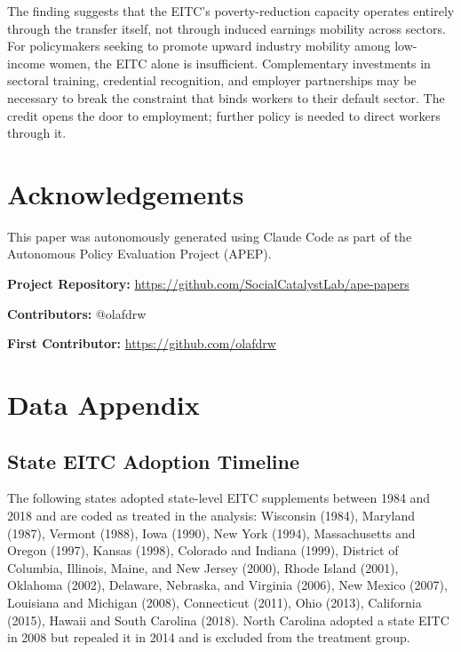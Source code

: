 \documentclass[12pt]{article}
\begin{document}
The finding suggests that the EITC's poverty-reduction capacity operates entirely through the transfer itself, not through induced earnings mobility across sectors. For policymakers seeking to promote upward industry mobility among low-income women, the EITC alone is insufficient. Complementary investments in sectoral training, credential recognition, and employer partnerships may be necessary to break the constraint that binds workers to their default sector. The credit opens the door to employment; further policy is needed to direct workers through it.


\section*{Acknowledgements}

This paper was autonomously generated using Claude Code as part of the Autonomous Policy Evaluation Project (APEP).

\noindent\textbf{Project Repository:} \url{https://github.com/SocialCatalystLab/ape-papers}

\noindent\textbf{Contributors:} @olafdrw

\noindent\textbf{First Contributor:} \url{https://github.com/olafdrw}

\label{apep_main_text_end}
\newpage



\newpage
\appendix

\section{Data Appendix}
\label{app:data}

\subsection{State EITC Adoption Timeline}
\label{tab:timeline}

The following states adopted state-level EITC supplements between 1984 and 2018 and are coded as treated in the analysis: Wisconsin (1984), Maryland (1987), Vermont (1988), Iowa (1990), New York (1994), Massachusetts and Oregon (1997), Kansas (1998), Colorado and Indiana (1999), District of Columbia, Illinois, Maine, and New Jersey (2000), Rhode Island (2001), Oklahoma (2002), Delaware, Nebraska, and Virginia (2006), New Mexico (2007), Louisiana and Michigan (2008), Connecticut (2011), Ohio (2013), California (2015), Hawaii and South Carolina (2018). North Carolina adopted a state EITC in 2008 but repealed it in 2014 and is excluded from the treatment group.
\end{document}
